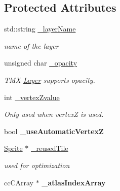 \subsection*{Protected Attributes}
\begin{DoxyCompactItemize}
\item 
\mbox{\label{classTMXLayer_a9b8057f8917717f2147a9ec4fc63445b}} 
std\+::string \hyperlink{classTMXLayer_a9b8057f8917717f2147a9ec4fc63445b}{\+\_\+layer\+Name}
\begin{DoxyCompactList}\small\item\em name of the layer \end{DoxyCompactList}\item 
\mbox{\label{classTMXLayer_a751b2aadc8ada8825af2a22bd573da64}} 
unsigned char \hyperlink{classTMXLayer_a751b2aadc8ada8825af2a22bd573da64}{\+\_\+opacity}
\begin{DoxyCompactList}\small\item\em T\+MX \hyperlink{classLayer}{Layer} supports opacity. \end{DoxyCompactList}\item 
\mbox{\label{classTMXLayer_aa3d7692da2954c244ac057a1bd8bd22a}} 
int \hyperlink{classTMXLayer_aa3d7692da2954c244ac057a1bd8bd22a}{\+\_\+vertex\+Zvalue}
\begin{DoxyCompactList}\small\item\em Only used when vertexZ is used. \end{DoxyCompactList}\item 
\mbox{\label{classTMXLayer_ab302464748c3cfeae4296c0a44c4b924}} 
bool {\bfseries \+\_\+use\+Automatic\+VertexZ}
\item 
\mbox{\label{classTMXLayer_a0bcd2a6deff12a785f63f727ceaf4cc0}} 
\hyperlink{classSprite}{Sprite} $\ast$ \hyperlink{classTMXLayer_a0bcd2a6deff12a785f63f727ceaf4cc0}{\+\_\+reused\+Tile}
\begin{DoxyCompactList}\small\item\em used for optimization \end{DoxyCompactList}\item 
\mbox{\label{classTMXLayer_a409c1626c01fe9c785925299a84d75ef}} 
cc\+C\+Array $\ast$ {\bfseries \+\_\+atlas\+Index\+Array}

\end{DoxyCompactItemize}
